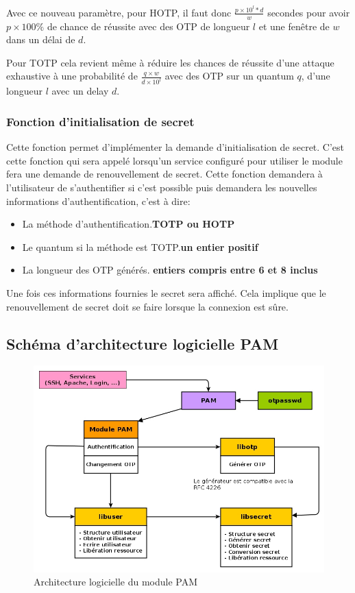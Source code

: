 Avec ce nouveau paramètre, pour HOTP, il faut donc $\frac{p\times10^{l}*d}{w}$
secondes pour avoir $p\times100\%$ de chance de réussite avec des OTP de
longueur $l$ et une fenêtre de $w$ dans un délai de $d$.

Pour TOTP cela revient même à réduire les chances de réussite d'une attaque
exhaustive à une probabilité de $\frac{q\times w}{d\times10^{l}}$ avec des OTP
sur un quantum $q$, d'une longueur $l$ avec un delay $d$.


\subsubsection{Fonction d'initialisation de secret}
Cette fonction permet d'implémenter la demande d'initialisation de secret.
C'est cette fonction qui sera appelé lorsqu'un service configuré pour utiliser
le module fera une demande de renouvellement de secret. Cette fonction demandera
à l'utilisateur de s'authentifier si c'est possible puis demandera les nouvelles
informations d'authentification, c'est à dire:
\begin{itemize}
  \item La méthode d'authentification.\hfill\textbf{TOTP ou HOTP}
  \item Le quantum si la méthode est TOTP.\hfill \textbf{un entier positif}
  \item La longueur des OTP générés.
  \hfill\textbf{entiers compris entre 6 et 8 inclus}
\end{itemize}
Une fois ces informations fournies le secret sera affiché. Cela implique que le
renouvellement de secret doit se faire lorsque la connexion est sûre.
\newpage
\subsection{Schéma d'architecture logicielle PAM}
  \begin{figure}[h!]
    \centering
    \includegraphics[width=\textwidth]{../graphics/architecturepammodule.jpg}
    \caption{Architecture logicielle du module PAM}
  \end{figure}

